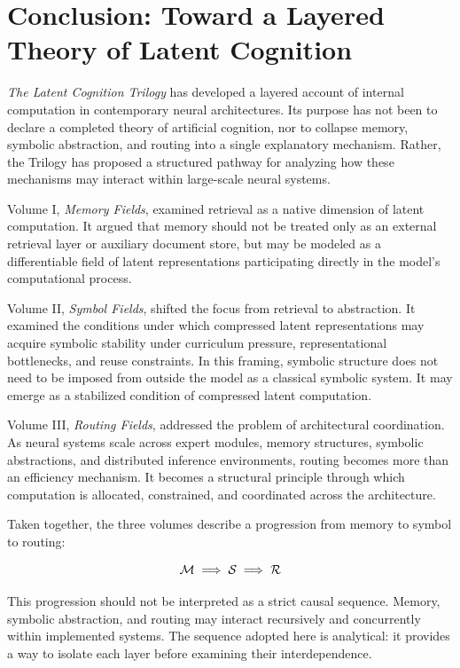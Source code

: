 \chapter{Conclusion: Toward a Layered Theory of Latent Cognition}

\textit{The Latent Cognition Trilogy} has developed a layered account of internal computation in contemporary neural architectures. Its purpose has not been to declare a completed theory of artificial cognition, nor to collapse memory, symbolic abstraction, and routing into a single explanatory mechanism. Rather, the Trilogy has proposed a structured pathway for analyzing how these mechanisms may interact within large-scale neural systems.

Volume I, \textit{Memory Fields}, examined retrieval as a native dimension of latent computation. It argued that memory should not be treated only as an external retrieval layer or auxiliary document store, but may be modeled as a differentiable field of latent representations participating directly in the model's computational process.

Volume II, \textit{Symbol Fields}, shifted the focus from retrieval to abstraction. It examined the conditions under which compressed latent representations may acquire symbolic stability under curriculum pressure, representational bottlenecks, and reuse constraints. In this framing, symbolic structure does not need to be imposed from outside the model as a classical symbolic system. It may emerge as a stabilized condition of compressed latent computation.

Volume III, \textit{Routing Fields}, addressed the problem of architectural coordination. As neural systems scale across expert modules, memory structures, symbolic abstractions, and distributed inference environments, routing becomes more than an efficiency mechanism. It becomes a structural principle through which computation is allocated, constrained, and coordinated across the architecture.

Taken together, the three volumes describe a progression from memory to symbol to routing:

\[
\mathcal{M} \;\Longrightarrow\; \mathcal{S} \;\Longrightarrow\; \mathcal{R}
\]

This progression should not be interpreted as a strict causal sequence. Memory, symbolic abstraction, and routing may interact recursively and concurrently within implemented systems. The sequence adopted here is analytical: it provides a way to isolate each layer before examining their interdependence.

